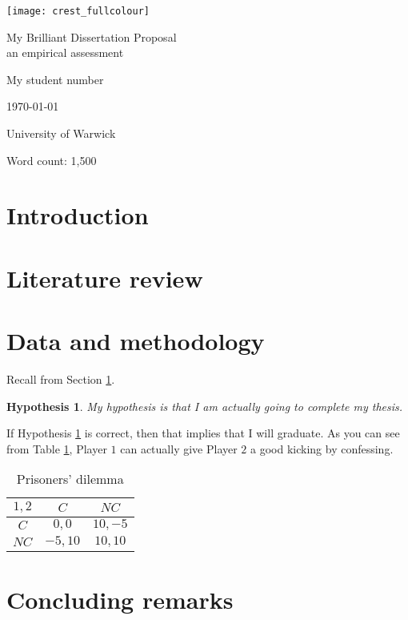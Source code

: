 \documentclass[12pt]{article}
\newtheorem{hypothesis}{Hypothesis}
\begin{document}
\begin{center}
\texttt{[image: crest\_fullcolour]}

\vspace{2cm}

{\huge My Brilliant Dissertation Proposal \\ an empirical assessment}	

\vspace{1cm}

{\large My student number}

\vspace{1cm}

{\large \today}

\vspace{1cm}

{\Large University of Warwick}

\thispagestyle{empty}

\vfill

\begin{flushright}
	Word count: 1,500
\end{flushright}

\end{center}


\newpage

\section{Introduction} \label{Introduction}



\section{Literature review}


\section{Data and methodology}
Recall from Section \ref{Introduction}.

\begin{hypothesis} \label{thesis completion}
	My hypothesis is that I am actually going to complete my thesis.
\end{hypothesis}
If Hypothesis \ref{thesis completion} is correct, then that implies that I will graduate. As you can see from Table \ref{Prisoners' dilemma}, Player $ 1 $ can actually give Player $ 2 $ a good kicking by confessing.


\begin{table}[htbp]
	\caption{Prisoners' dilemma}
	\label{Prisoners' dilemma}
	\centering
	\begin{tabular}{|c|c|c|}
		\hline $ 1,2 $ & $ C $ & $ NC $ \\ 
		\hline $ C $ & $ 0,0 $ & $ 10,-5 $ \\ 
		\hline $ NC $ & $ -5,10 $ & $ 10,10 $ \\ 
		\hline 
	\end{tabular} 
\end{table}



\section{Concluding remarks}
\end{document}
